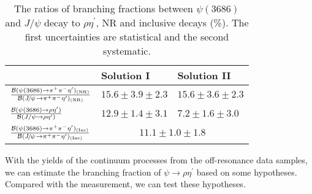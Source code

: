 \documentclass[twocolumn,showpacs,aps,prd]{revtex4-1}
\newcommand{\etap}{\eta^{\prime}}
\newcommand{\psip}{\psi(3686)}
\newcommand{\ratiophspI} {$15.6\pm 3.9  \pm 2.3 $} %
\newcommand{\ratiophspII}{$15.6\pm 3.6  \pm 2.3 $}
\newcommand{\ratiorhoI}  {$12.9\pm 1.4  \pm 3.1 $}
\newcommand{\ratiorhoII} {$7.2 \pm 1.6  \pm 3.0 $}
\newcommand{\ratiototal} {$11.1 \pm 1.0  \pm 1.8 $}
\begin{document}
%
\begin{table*}[htbp]
\begin{center}\normalsize
  \caption{The ratios of branching fractions between $\psip$ and $J/\psi$ decay to $\rho\eta^\prime$, NR and inclusive
  decays (\%). The first uncertainties are statistical and the second systematic.}
  \label{ratios}
  \setlength{\extrarowheight}{0.8ex}
  \renewcommand{\arraystretch}{0.8}
  \vspace{0.2cm}
  \begin{tabular}{p{5.0cm}m{4.7cm}<{\centering}m{4.7cm}<{\centering}}
  \hline\hline
                                                         &Solution I                                &Solution II  \\
                                                         \hline
  \multirow{2}{*}{$\frac{{\cal B}(\psip \to \pi^{+}\pi^{-}\eta^{\prime})_{(\text{NR})}}{{\cal B}(\jpsi \to \pi^{+}\pi^{-}\eta^{\prime})_{(\text{NR})}}$} &\multirow{2}{*}{\ratiophspI}&\multirow{2}{*}{\ratiophspII}  \\
  &&\\
  \multirow{2}{*}{$\frac{{\cal B}(\psip \to \rho\eta^{\prime})}{{\cal B}(J/\psi\to \rho\eta^{\prime})}$} &\multirow{2}{*}{\ratiorhoI}&\multirow{2}{*}{\ratiorhoII}  \\
  &&\\
  \hline
  \multirow{2}{*}{$\frac{{\cal B}(\psip \to \pi^{+}\pi^{-}\eta^{\prime})_{(\text{Inc})}}{{\cal B}(\jpsi \to \pi^{+}\pi^{-}\eta^{\prime})_{(\text{Inc})}}$}
  &\multicolumn{2}{c}{\multirow{2}{*}{\ratiototal}} \\
  &&\\
  \hline\hline
  \end{tabular}
  \vspace{-0.2cm}
\end{center}
\end{table*}
%

With the yields of the continuum processes from the off-resonance data samples, we can estimate the branching fraction of $\psi \to \rho \etap$ based on some hypotheses. Compared with the measurement, we can test these hypotheses.
\end{document}
